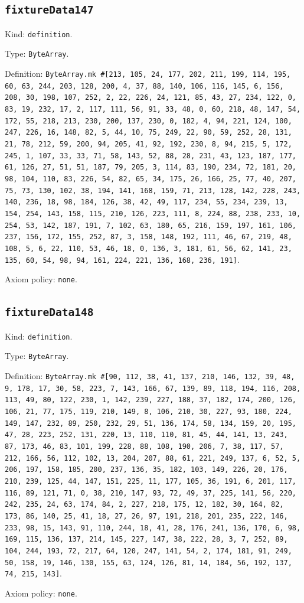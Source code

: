 \documentclass[11pt]{article}
\begin{document}
\subsection*{\texttt{fixtureData147}}
\noindent Kind: \texttt{definition}.\par
\noindent Type: \texttt{ByteArray}.\par
\noindent Definition: \texttt{ByteArray.mk \#[213, 105, 24, 177, 202, 211, 199, 114, 195, 60, 63, 244, 203, 128, 200, 4, 37, 88, 140, 106, 116, 145, 6, 156, 208, 30, 198, 107, 252, 2, 22, 226, 24, 121, 85, 43, 27, 234, 122, 0, 83, 19, 232, 17, 2, 117, 111, 56, 91, 33, 48, 0, 60, 218, 48, 147, 54, 172, 55, 218, 213, 230, 200, 137, 230, 0, 182, 4, 94, 221, 124, 100, 247, 226, 16, 148, 82, 5, 44, 10, 75, 249, 22, 90, 59, 252, 28, 131, 21, 78, 212, 59, 200, 94, 205, 41, 92, 192, 230, 8, 94, 215, 5, 172, 245, 1, 107, 33, 33, 71, 58, 143, 52, 88, 28, 231, 43, 123, 187, 177, 61, 126, 27, 51, 51, 187, 79, 205, 3, 114, 83, 190, 234, 72, 181, 20, 98, 104, 110, 83, 226, 54, 82, 65, 34, 175, 26, 166, 25, 77, 40, 207, 75, 73, 130, 102, 38, 194, 141, 168, 159, 71, 213, 128, 142, 228, 243, 140, 236, 18, 98, 184, 126, 38, 42, 49, 117, 234, 55, 234, 239, 13, 154, 254, 143, 158, 115, 210, 126, 223, 111, 8, 224, 88, 238, 233, 10, 254, 53, 142, 187, 191, 7, 102, 63, 180, 65, 216, 159, 197, 161, 106, 237, 156, 172, 155, 252, 87, 3, 158, 148, 192, 111, 46, 67, 219, 48, 108, 5, 6, 22, 110, 53, 46, 18, 0, 136, 3, 181, 61, 56, 62, 141, 23, 135, 60, 54, 98, 94, 161, 224, 221, 136, 168, 236, 191]}.\par
\noindent Axiom policy: \texttt{none}.\par
\subsection*{\texttt{fixtureData148}}
\noindent Kind: \texttt{definition}.\par
\noindent Type: \texttt{ByteArray}.\par
\noindent Definition: \texttt{ByteArray.mk \#[90, 112, 38, 41, 137, 210, 146, 132, 39, 48, 9, 178, 17, 30, 58, 223, 7, 143, 166, 67, 139, 89, 118, 194, 116, 208, 113, 49, 80, 122, 230, 1, 142, 239, 227, 188, 37, 182, 174, 200, 126, 106, 21, 77, 175, 119, 210, 149, 8, 106, 210, 30, 227, 93, 180, 224, 149, 147, 232, 89, 250, 232, 29, 51, 136, 174, 58, 134, 159, 20, 195, 47, 28, 223, 252, 131, 220, 13, 110, 110, 81, 45, 44, 141, 13, 243, 87, 173, 46, 83, 101, 199, 228, 88, 108, 190, 206, 7, 38, 117, 57, 212, 166, 56, 112, 102, 13, 204, 207, 88, 61, 221, 249, 137, 6, 52, 5, 206, 197, 158, 185, 200, 237, 136, 35, 182, 103, 149, 226, 20, 176, 210, 239, 125, 44, 147, 151, 225, 11, 177, 105, 36, 191, 6, 201, 117, 116, 89, 121, 71, 0, 38, 210, 147, 93, 72, 49, 37, 225, 141, 56, 220, 242, 235, 24, 63, 174, 84, 2, 227, 218, 175, 12, 182, 30, 164, 82, 173, 86, 140, 25, 41, 18, 27, 26, 97, 191, 218, 201, 235, 222, 146, 233, 98, 15, 143, 91, 110, 244, 18, 41, 28, 176, 241, 136, 170, 6, 98, 169, 115, 136, 137, 214, 145, 227, 147, 38, 222, 28, 3, 7, 252, 89, 104, 244, 193, 72, 217, 64, 120, 247, 141, 54, 2, 174, 181, 91, 249, 50, 158, 19, 146, 130, 155, 63, 124, 126, 81, 14, 184, 56, 192, 137, 74, 215, 143]}.\par
\noindent Axiom policy: \texttt{none}.\par
\end{document}
